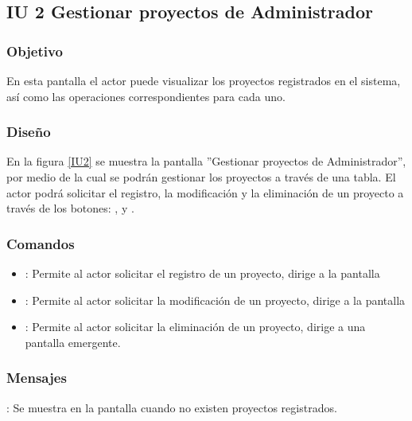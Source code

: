 \subsection{IU 2 Gestionar proyectos de Administrador}

\subsubsection{Objetivo}
	En esta pantalla el actor puede visualizar los proyectos registrados en el sistema, así como las operaciones correspondientes para cada uno.

\subsubsection{Diseño}
	En la figura \ref{IU2} se muestra la pantalla ''Gestionar proyectos de Administrador'', por medio de la cual se podrán gestionar los proyectos a través de una tabla. El actor podrá solicitar el registro, la modificación y la eliminación de un proyecto a través de los botones: , \editar y \eliminar.

\label{IU2}
\subsubsection{Comandos}
\begin{itemize}
	\item {}: Permite al actor solicitar el registro de un proyecto, dirige a la pantalla 
	\item \editar [Modificar]: Permite al actor solicitar la modificación de un proyecto, dirige a la pantalla 
	\item \eliminar [Eliminar]: Permite al actor solicitar la eliminación de un proyecto, dirige a una pantalla emergente.
\end{itemize}

\subsubsection{Mensajes}

\begin{Citemize}
	\item {}: Se muestra en la pantalla  cuando no existen proyectos registrados.
\end{Citemize}
